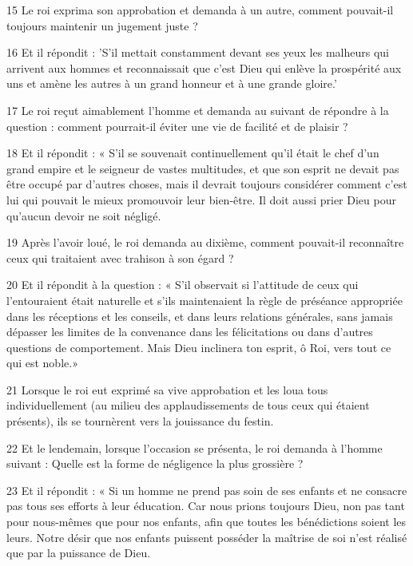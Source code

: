 \par 15 Le roi exprima son approbation et demanda à un autre, comment pouvait-il toujours maintenir un jugement juste ?

\par 16 Et il répondit : 'S'il mettait constamment devant ses yeux les malheurs qui arrivent aux hommes et reconnaissait que c'est Dieu qui enlève la prospérité aux uns et amène les autres à un grand honneur et à une grande gloire.'

\par 17 Le roi reçut aimablement l'homme et demanda au suivant de répondre à la question : comment pourrait-il éviter une vie de facilité et de plaisir ?

\par 18 Et il répondit : « S'il se souvenait continuellement qu'il était le chef d'un grand empire et le seigneur de vastes multitudes, et que son esprit ne devait pas être occupé par d'autres choses, mais il devrait toujours considérer comment c'est lui qui pouvait le mieux promouvoir leur bien-être. Il doit aussi prier Dieu pour qu'aucun devoir ne soit négligé.

\par 19 Après l'avoir loué, le roi demanda au dixième, comment pouvait-il reconnaître ceux qui traitaient avec trahison à son égard ?

\par 20 Et il répondit à la question : « S'il observait si l'attitude de ceux qui l'entouraient était naturelle et s'ils maintenaient la règle de préséance appropriée dans les réceptions et les conseils, et dans leurs relations générales, sans jamais dépasser les limites de la convenance dans les félicitations ou dans d'autres questions de comportement. Mais Dieu inclinera ton esprit, ô Roi, vers tout ce qui est noble.»

\par 21 Lorsque le roi eut exprimé sa vive approbation et les loua tous individuellement (au milieu des applaudissements de tous ceux qui étaient présents), ils se tournèrent vers la jouissance du festin.

\par 22 Et le lendemain, lorsque l'occasion se présenta, le roi demanda à l'homme suivant : Quelle est la forme de négligence la plus grossière ?

\par 23 Et il répondit : « Si un homme ne prend pas soin de ses enfants et ne consacre pas tous ses efforts à leur éducation. Car nous prions toujours Dieu, non pas tant pour nous-mêmes que pour nos enfants, afin que toutes les bénédictions soient les leurs. Notre désir que nos enfants puissent posséder la maîtrise de soi n'est réalisé que par la puissance de Dieu.

